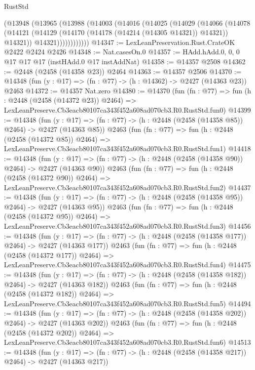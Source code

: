 \begin{lexlean}{RustStd}
\begin{coremodule}
          (@13948
            (@13965
              (@13988
                (@14003
                  (@14016
                    (@14025
                      (@14029
                        (@14066
                          (@14078
                            (@14121
                              (@14129 (@14170 (@14178 (@14214 (@14305 @14321)) @14321)) @14321))
                            @14321))))))))))))
@14347 := LexLeanPreservation.Rust.CrateOK @2422 @2424 @2426
@14348 := Nat.casesOn.{0}
@14357 := HAdd.hAdd.{0, 0, 0} @17 @17 @17 (instHAdd.{0} @17 instAddNat)
@14358 := @14357 @2508
@14362 := @2448 (@2458 (@14358 @23)) @2464
@14363 := @14357 @2506
@14370 := @14348 (fun (y : @17) => (fn : @77) -> (h : @14362) -> @2427 (@14363 @23)) @2463
@14372 := @14357 Nat.zero
@14380 := @14370
    (fun (fn : @77) =>
    fun (h : @2448 (@2458 (@14372 @23)) @2464) =>
    LexLeanPreserve.Cb3eacb80107ca343f452a608ad070cb3.R0.RustStd.fun0)
@14399 := @14348
    (fun (y : @17) => (fn : @77) -> (h : @2448 (@2458 (@14358 @85)) @2464) -> @2427 (@14363 @85))
    @2463
    (fun (fn : @77) =>
    fun (h : @2448 (@2458 (@14372 @85)) @2464) =>
    LexLeanPreserve.Cb3eacb80107ca343f452a608ad070cb3.R0.RustStd.fun1)
@14418 := @14348
    (fun (y : @17) => (fn : @77) -> (h : @2448 (@2458 (@14358 @90)) @2464) -> @2427 (@14363 @90))
    @2463
    (fun (fn : @77) =>
    fun (h : @2448 (@2458 (@14372 @90)) @2464) =>
    LexLeanPreserve.Cb3eacb80107ca343f452a608ad070cb3.R0.RustStd.fun2)
@14437 := @14348
    (fun (y : @17) => (fn : @77) -> (h : @2448 (@2458 (@14358 @95)) @2464) -> @2427 (@14363 @95))
    @2463
    (fun (fn : @77) =>
    fun (h : @2448 (@2458 (@14372 @95)) @2464) =>
    LexLeanPreserve.Cb3eacb80107ca343f452a608ad070cb3.R0.RustStd.fun3)
@14456 := @14348
    (fun (y : @17) => (fn : @77) -> (h : @2448 (@2458 (@14358 @177)) @2464) -> @2427 (@14363 @177))
    @2463
    (fun (fn : @77) =>
    fun (h : @2448 (@2458 (@14372 @177)) @2464) =>
    LexLeanPreserve.Cb3eacb80107ca343f452a608ad070cb3.R0.RustStd.fun4)
@14475 := @14348
    (fun (y : @17) => (fn : @77) -> (h : @2448 (@2458 (@14358 @182)) @2464) -> @2427 (@14363 @182))
    @2463
    (fun (fn : @77) =>
    fun (h : @2448 (@2458 (@14372 @182)) @2464) =>
    LexLeanPreserve.Cb3eacb80107ca343f452a608ad070cb3.R0.RustStd.fun5)
@14494 := @14348
    (fun (y : @17) => (fn : @77) -> (h : @2448 (@2458 (@14358 @202)) @2464) -> @2427 (@14363 @202))
    @2463
    (fun (fn : @77) =>
    fun (h : @2448 (@2458 (@14372 @202)) @2464) =>
    LexLeanPreserve.Cb3eacb80107ca343f452a608ad070cb3.R0.RustStd.fun6)
@14513 := @14348
    (fun (y : @17) => (fn : @77) -> (h : @2448 (@2458 (@14358 @217)) @2464) -> @2427 (@14363 @217))

\end{coremodule}
\end{lexlean}
